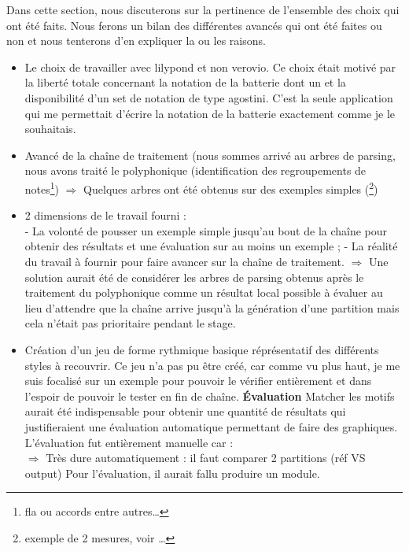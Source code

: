 Dans cette section, nous discuterons sur la pertinence de l’ensemble des choix
qui ont été faits. Nous ferons un bilan des différentes avancés qui ont été
faites ou non et nous tenterons d’en expliquer la ou les raisons.
\begin{itemize}
    \item Le choix de travailler avec lilypond et non verovio. Ce choix était
        motivé par la liberté totale concernant la notation de la batterie dont
        un et la disponibilité d’un set de notation de type agostini. C’est la
        seule application qui me permettait d’écrire la notation de la batterie
        exactement comme je le souhaitais.
    \item Avancé de la chaîne de traitement (nous sommes arrivé au arbres de
        parsing, nous avons traité le polyphonique (identification des
        regroupements de notes\footnote{fla ou accords entre autres…})
        $\Rightarrow$ Quelques arbres ont été obtenus sur des exemples simples
        (\footnote{exemple de 2 mesures, voir …})
    \item 2 dimensions de le travail fourni :\\
        - La volonté de pousser un exemple simple jusqu’au bout de la chaîne
        pour obtenir des résultats et une évaluation sur au moins un exemple ;
        - La réalité du travail à fournir pour faire avancer sur la chaîne de
        traitement.
        $\Rightarrow$ Une solution aurait été de considérer les arbres de
        parsing obtenus après le traitement du polyphonique comme un résultat
        local possible à évaluer au lieu d’attendre que la chaîne arrive
        jusqu’à la génération d’une partition mais cela n’était pas prioritaire
        pendant le stage.
    \item Création d’un jeu de forme rythmique basique réprésentatif des
        différents styles à recouvrir. Ce jeu n’a pas pu être créé, car comme
        vu plus haut, je me suis focalisé sur un exemple pour pouvoir le
        vérifier entièrement et dans l’espoir de pouvoir le tester en fin de
        chaîne.
\textbf{Évaluation}
     Matcher les motifs aurait été indispensable pour obtenir une quantité
        de résultats qui justifieraient une évaluation automatique permettant
        de faire des graphiques.\\
	 L’évaluation fut entièrement manuelle car :\\
	$\Rightarrow$ Très dure automatiquement : il faut comparer 2 partitions
    (réf \tab VS output)
Pour l’évaluation, il aurait fallu produire un module.\\

\end{itemize}
